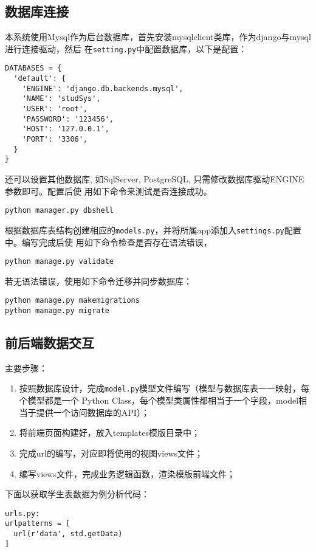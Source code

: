 \documentclass{ede}
\begin{document}
\subsection{数据库连接}

本系统使用Mysql作为后台数据库，首先安装mysqlclient类库，作为django与mysql进行连接驱动，然后
在\texttt{setting.py}中配置数据库，以下是配置：

\begin{verbatim}
DATABASES = {
  'default': {
    'ENGINE': 'django.db.backends.mysql',
    'NAME': 'studSys',
    'USER': 'root',
    'PASSWORD': '123456',
    'HOST': '127.0.0.1',
    'PORT': '3306',
  }
}
\end{verbatim}

还可以设置其他数据库, 如SqlServer, PostgreSQL, 只需修改数据库驱动ENGINE参数即可。配置后使
用如下命令来测试是否连接成功。
\begin{verbatim}
python manager.py dbshell
\end{verbatim}
根据数据库表结构创建相应的\texttt{models.py}，并将所属app添加入\texttt{settings.py}配置中。编写完成后使
用如下命令检查是否存在语法错误，
\begin{verbatim}
python manage.py validate
\end{verbatim}
若无语法错误，使用如下命令迁移并同步数据库：
\begin{verbatim}
python manage.py makemigrations
python manage.py migrate 
\end{verbatim}

\subsection{前后端数据交互}

主要步骤：
\begin{enumerate}
\item 按照数据库设计，完成\texttt{model.py}模型文件编写（模型与数据库表一一映射，每个模型都是一个
  Python Class，每个模型类属性都相当于一个字段，model相当于提供一个访问数据库的API）；
\item 将前端页面构建好，放入templates模版目录中；
\item 完成url的编写，对应即将使用的视图views文件；
\item 编写views文件，完成业务逻辑函数，渲染模版前端文件；
\end{enumerate}
下面以获取学生表数据为例分析代码：

\begin{verbatim}
urls.py:
urlpatterns = [
  url(r'data', std.getData)
]
\end{verbatim}
\end{document}
